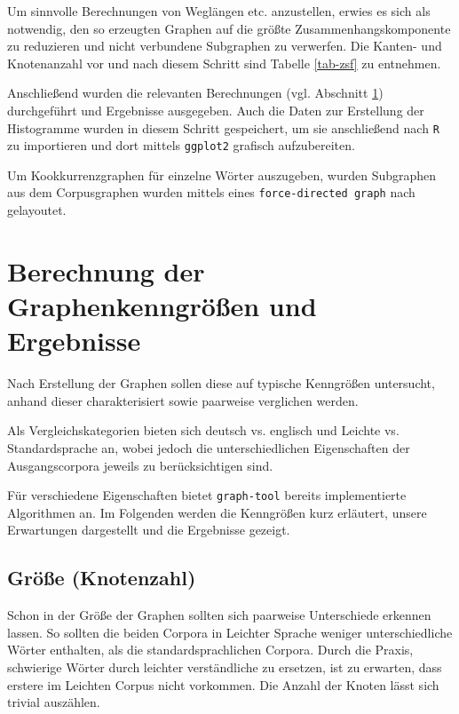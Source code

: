 \documentclass[11pt, a4paper]{article}
\begin{document}
Um sinnvolle Berechnungen von Weglängen etc. anzustellen, erwies es sich als
notwendig, den so erzeugten Graphen auf die größte Zusammenhangskomponente zu
reduzieren und nicht verbundene Subgraphen zu verwerfen.
Die Kanten- und Knotenanzahl vor und nach diesem Schritt sind Tabelle
\ref{tab-zsf} zu entnehmen.

Anschließend wurden die relevanten Berechnungen (vgl. Abschnitt
\ref{sec:berechnung-ergebnisse}) durchgeführt und Ergebnisse ausgegeben.
Auch die Daten zur Erstellung der Histogramme wurden in diesem Schritt
gespeichert, um sie anschließend nach \texttt{R} zu importieren und dort mittels
\texttt{ggplot2} grafisch aufzubereiten.

Um Kookkurrenzgraphen für einzelne Wörter auszugeben, wurden Subgraphen aus dem
Corpusgraphen wurden mittels eines \texttt{force-directed graph} nach
\cite{Hu2006} gelayoutet.


\section{Berechnung der Graphenkenngr\"o\ss{}en und Ergebnisse}
\label{sec:berechnung-ergebnisse}

Nach Erstellung der Graphen sollen diese auf typische Kenngrößen untersucht,
anhand dieser charakterisiert sowie paarweise verglichen werden.

Als Vergleichskategorien bieten sich deutsch vs. englisch und Leichte vs.
Standardsprache an, wobei jedoch die unterschiedlichen Eigenschaften der
Ausgangscorpora jeweils zu berücksichtigen sind.

Für verschiedene Eigenschaften bietet \texttt{graph-tool} bereits implementierte
Algorithmen an. Im Folgenden werden die Kenngrößen kurz erläutert, unsere
Erwartungen dargestellt und die Ergebnisse gezeigt.


\subsection{Gr\"o\ss{}e (Knotenzahl)}
\label{groesse-knotenzahl}

Schon in der Größe der Graphen sollten sich paarweise Unterschiede erkennen
lassen. So sollten die beiden Corpora in Leichter Sprache weniger
unterschiedliche Wörter enthalten, als die standardsprachlichen Corpora.
Durch die Praxis, schwierige Wörter
durch leichter verständliche zu ersetzen, ist zu erwarten, dass erstere im
Leichten Corpus nicht vorkommen. Die Anzahl der Knoten lässt sich trivial
auszählen.
\end{document}

